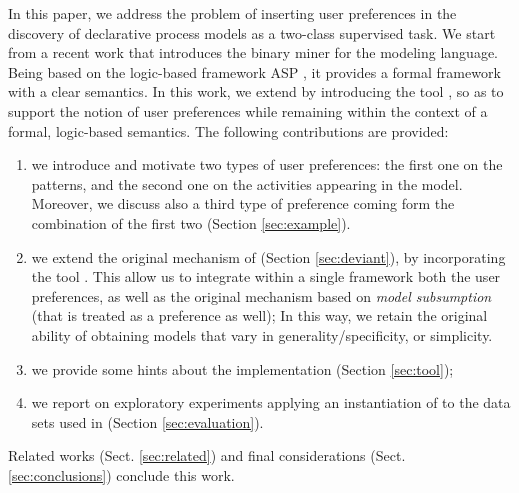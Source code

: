 In this paper, we address the problem of inserting user preferences in the discovery of declarative process models as a two-class supervised task. We start from a recent work \cite{deviant-tkde} that introduces the \nd binary miner for the \declare \cite{2009-Aalst} modeling language. Being \nd based on the logic-based framework ASP \cite{asp-intro}, it provides a formal framework with a clear semantics. In this work, we extend \nd by introducing the \asprin tool \cite{DBLP:conf/aaai/BrewkaD0S15}, so as to support the notion of user preferences while remaining within the context of a formal, logic-based semantics. The following contributions are provided:
%
\begin{enumerate}[{(i)}]
    \item we introduce and motivate two types of user preferences: the first one on the \declare patterns, and the second one on the activities appearing in the model. Moreover, we discuss also a third type of preference coming form the combination of the first two (Section \ref{sec:example}).
	\item we extend the original mechanism of \nd (Section \ref{sec:deviant}), by incorporating the \asprin tool \cite{DBLP:conf/aaai/BrewkaD0S15}. This allow us to integrate within a single framework both the user preferences, as well as the original \nd mechanism based on \emph{model subsumption} (that is treated as a preference as well); In this way, we retain the original ability of obtaining models that vary in generality/specificity, or simplicity.
	\item we provide some hints about the implementation (Section \ref{sec:tool});   
	\item we report on exploratory experiments applying an instantiation of \nd  to the data sets used in \cite{2007b-Lamma,DBLP:conf/bpm/SlaatsDB21} (Section \ref{sec:evaluation}).
\end{enumerate}
Related works (Sect. \ref{sec:related}) and final considerations (Sect. \ref{sec:conclusions}) conclude this work.

